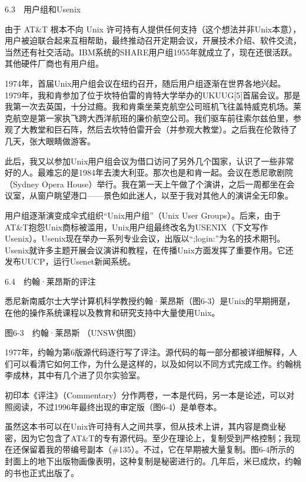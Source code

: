\documentclass[a4paper,12pt,UTF8,twoside]{ctexbook}
\begin{document}
6.3　用户组和Usenix


由于 AT\&T 根本不向 Unix 许可持有人提供任何支持（这个想法并非Unix本意），用户被迫联合起来互相帮助，最终推动召开定期会议，开展技术介绍、软件交流，当然还有社交活动。IBM系统的SHARE用户组1955年就成立了，现在还很活跃。其他硬件厂商也有用户组。

1974年，首届Unix用户组会议在纽约召开，随后用户组逐渐在世界各地兴起。1979年，我和肯参加了位于坎特伯雷的肯特大学举办的UKUUG[5]首届会议。那是我第一次去英国，十分过瘾。我和肯乘坐莱克航空公司班机飞往盖特威克机场。莱克航空是第一家执飞跨大西洋航班的廉价航空公司。我们驱车前往索尔兹伯里，参观了大教堂和巨石阵，然后去坎特伯雷开会（并参观大教堂）。之后我在伦敦待了几天，张大眼睛做游客。

此后，我又以参加Unix用户组会议为借口访问了另外几个国家，认识了一些非常好的人。最难忘的是1984年去澳大利亚。那次也是和肯一起。会议在悉尼歌剧院（Sydney Opera House）举行。我在第一天上午做了个演讲，之后一周都坐在会议室，从窗户眺望港口——景色如此迷人，以至于我对其他人的演讲全无印象。

用户组逐渐演变成伞式组织“Unix用户组”（Unix User Groups）。后来，由于AT\&T抱怨Unix商标被滥用，Unix用户组最终改名为USENIX（下文写作Usenix）。Usenix现在举办一系列专业会议，出版以“;login:”为名的技术期刊。Usenix就许多主题开展会议演讲和教程，在传播Unix方面发挥了重要作用。它还发布UUCP，运行Usenet新闻系统。





6.4　约翰·莱昂斯的评注


悉尼新南威尔士大学计算机科学教授约翰·莱昂斯（图6-3）是Unix的早期拥趸，在他的操作系统课程以及教育和研究支持中大量使用Unix。



图6-3　约翰·莱昂斯 （UNSW供图）

1977年，约翰为第6版源代码逐行写了评注。源代码的每一部分都被详细解释，人们可以看清它如何工作，为什么是这样的，以及如何以不同方式完成工作。约翰桃李成林，其中有几个进了贝尔实验室。

初印本《评注》（Commentary）分作两卷，一本是代码，另一本是论述，可以对照阅读，不过1996年最终出现的审定版（图6-4）是单卷本。

虽然这本书可以在Unix许可持有人之间共享，但从技术上讲，其内容是商业秘密，因为它包含了AT\&T的专有源代码。至少在理论上，复制受到严格控制；我现在还保留着我的带编号副本（\#135）。不过，它在早期被大量复制。图6-4所示的封面上的地下出版物画像表明，这种复制是秘密进行的。几年后，米已成炊，约翰的书也正式出版了。
\end{document}
